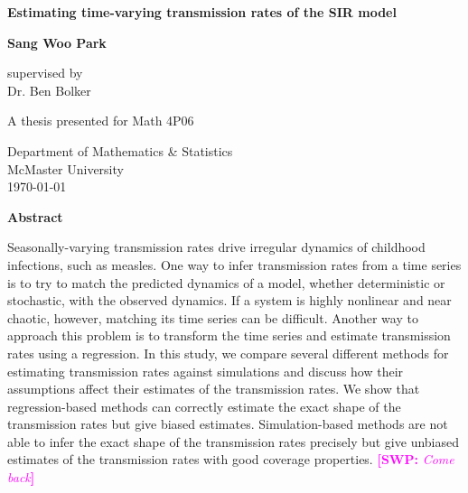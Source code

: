\documentclass{article}
\newcommand{\comment}[3]{\textcolor{#1}{\textbf{[#2: }\textsl{#3}\textbf{]}}}
\newcommand{\swp}[1]{\comment{magenta}{SWP}{#1}}
\begin{document}
\begin{titlepage}
   \begin{center}
       \vspace*{1cm}
 
       \textbf{Estimating time-varying transmission rates of the SIR model}
 
       \vspace{1.5cm}
 
       \textbf{Sang Woo Park}
 
       \vfill
 
       supervised by \\ \vspace{0.2cm}
       Dr. Ben Bolker
       
 	   \vspace{1.5cm}
 
       A thesis presented for Math 4P06\\
 
       \vspace{0.8cm}
 
       Department of Mathematics \& Statistics\\
       McMaster University\\
       \today
 
   \end{center}
\end{titlepage}
\pagebreak

\begin{center}
\textbf{Abstract}
\end{center}

Seasonally-varying transmission rates drive irregular dynamics of childhood infections, such as measles.
One way to infer transmission rates from a time series is to try to match the predicted dynamics of a model, whether deterministic or stochastic, with the observed dynamics.
If a system is highly nonlinear and near chaotic, however, matching its time series can be difficult.
Another way to approach this problem is to transform the time series and estimate transmission rates using a regression.
In this study, we compare several different methods for estimating transmission rates against simulations and discuss how their assumptions affect their estimates of the transmission rates.
We show that regression-based methods can correctly estimate the exact shape of the transmission rates but give biased estimates.
Simulation-based methods are not able to infer the exact shape of the transmission rates precisely but give unbiased estimates of the transmission rates with good coverage properties.
\swp{Come back}
\end{document}
